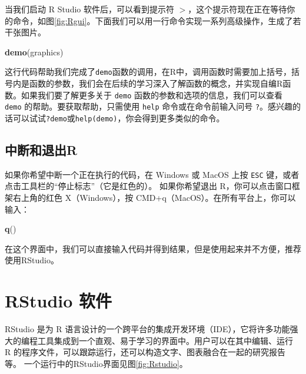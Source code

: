 \documentclass[
]{book}
\newenvironment{Shaded}{\begin{snugshade}}{\end{snugshade}}
\newcommand{\FunctionTok}[1]{\textcolor[rgb]{0.13,0.29,0.53}{\textbf{#1}}}
\newcommand{\NormalTok}[1]{#1}
\begin{document}
当我们启动 R Studio 软件后，可以看到提示符 \(>\)，这个提示符现在正在等待你的命令，如图\ref{fig:Rgui}。下面我们可以用一行命令实现一系列高级操作，生成了若干张图片。

\begin{Shaded}
\begin{Highlighting}[]
\FunctionTok{demo}\NormalTok{(graphics)}
\end{Highlighting}
\end{Shaded}

这行代码帮助我们完成了\texttt{demo}函数的调用，在R中，调用函数时需要加上括号，括号内是函数的参数，我们会在后续的学习深入了解函数的概念，并实现自编R函数。如果我们要了解更多关于 \texttt{demo} 函数的参数和选项的信息，我们可以查看 \texttt{demo} 的帮助。要获取帮助，只需使用 \texttt{help} 命令或在命令前输入问号 \texttt{?}。感兴趣的话可以试试\texttt{?demo}或\texttt{help(demo)}，你会得到更多类似的命令。

\subsection{中断和退出R}\label{ux4e2dux65adux548cux9000ux51far}

如果你希望中断一个正在执行的代码，在 Windows 或 MacOS 上按 \texttt{ESC} 键，或者点击工具栏的``停止标志''（它是红色的）。
如果你希望退出 R，你可以点击窗口框架右上角的红色 X（Windows），按 CMD+q（MacOS）。在所有平台上，你可以输入：

\begin{Shaded}
\begin{Highlighting}[]
\FunctionTok{q}\NormalTok{()}
\end{Highlighting}
\end{Shaded}

在这个界面中，我们可以直接输入代码并得到结果，但是使用起来并不方便，推荐使用RStudio。

\section{RStudio 软件}\label{rstudio-ux8f6fux4ef6}

RStudio 是为 R 语言设计的一个跨平台的集成开发环境（IDE），它将许多功能强大的编程工具集成到一个直观、易于学习的界面中。用户可以在其中编辑、运行 R 的程序文件，可以跟踪运行，还可以构造文字、图表融合在一起的研究报告等。 一个运行中的RStudio界面见图\ref{fig:Rstudio}。
\end{document}
